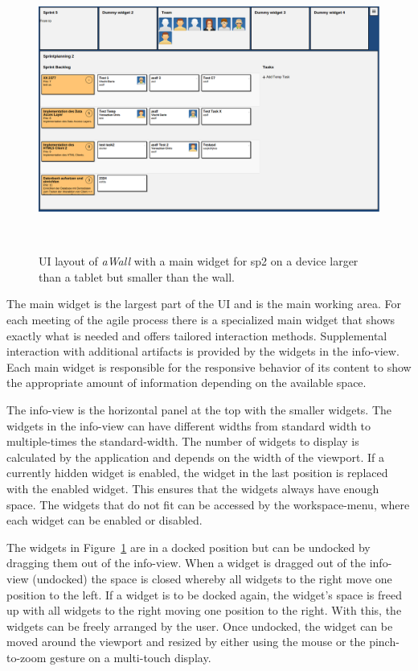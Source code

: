 \documentclass{sigchi}
\begin{document}
\begin{figure}[h]
	\centering
	\includegraphics[width=\columnwidth]{figures/awall-layout}
	\caption{UI layout of \textit{aWall} with a main widget for \gls{sp2} on a device larger than a tablet but smaller than the wall.}~\label{fig:awall-layout}
\end{figure}

The main widget is the largest part of the UI and is the main working area.
For each meeting of the agile process there is a specialized main widget that shows exactly what is needed and offers tailored interaction methods.
Supplemental interaction with additional artifacts is provided by the widgets in the info-view.
Each main widget is responsible for the responsive behavior of its content to show the appropriate amount of information depending on the available space.


The info-view is the horizontal panel at the top with the smaller widgets.
The widgets in the info-view can have different widths from standard width to multiple-times the standard-width.
The number of widgets to display is calculated by the application and depends on the width of the viewport.
If a currently hidden widget is enabled, the widget in the last position is replaced with the enabled widget.
This ensures that the widgets always have enough space.
The widgets that do not fit can be accessed by the workspace-menu, where each widget can be enabled or disabled. 


The widgets in Figure~\ref{fig:awall-layout} are in a docked position but can be undocked by dragging them out of the info-view.
When a widget is dragged out of the info-view (undocked) the space is closed whereby all widgets to the right move one position to the left.
If a widget is to be docked again, the widget's space is freed up with all widgets to the right moving one position to the right.
With this, the widgets can be freely arranged by the user.
Once undocked, the widget can be moved around the viewport and resized by either using the mouse or the pinch-to-zoom gesture on a multi-touch display. 
\end{document}
